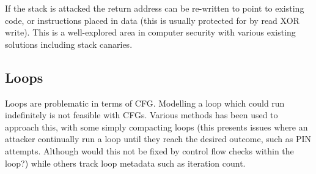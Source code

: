 If the stack is attacked the return address can be re-written to point to existing code, or instructions placed in data (this is usually protected for by read XOR write). This is a well-explored area in computer security with various existing solutions including stack canaries.

\subsection{Loops}
Loops are problematic in terms of CFG. Modelling a loop which could run indefinitely is not feasible with CFGs. Various methods has been used to approach this, with some simply compacting loops (this presents issues where an attacker continually run a loop until they reach the desired outcome, such as PIN attempts. Although would this not be fixed by control flow checks within the loop?) while others \cite{Dessouky2017} track loop metadata such as iteration count.